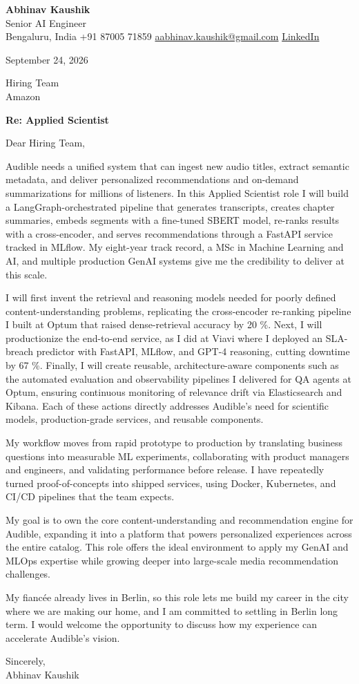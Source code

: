 \documentclass[11pt,a4paper]{article}
\begin{document}
{\Large\bfseries Abhinav Kaushik}\\
Senior AI Engineer\\
Bengaluru, India \textbar{} +91 87005 71859 \textbar{} \href{mailto:aabhinav.kaushik@gmail.com}{aabhinav.kaushik@gmail.com} \textbar{} \href{https://www.linkedin.com/in/abhinav-kaushik10/}{LinkedIn}  

September 24, 2026

Hiring Team\\
Amazon

\textbf{Re: Applied Scientist}

Dear Hiring Team,

Audible needs a unified system that can ingest new audio titles, extract semantic metadata, and deliver personalized recommendations and on-demand summarizations for millions of listeners. In this Applied Scientist role I will build a LangGraph-orchestrated pipeline that generates transcripts, creates chapter summaries, embeds segments with a fine-tuned SBERT model, re-ranks results with a cross-encoder, and serves recommendations through a FastAPI service tracked in MLflow. My eight-year track record, a MSc in Machine Learning and AI, and multiple production GenAI systems give me the credibility to deliver at this scale.

I will first invent the retrieval and reasoning models needed for poorly defined content-understanding problems, replicating the cross-encoder re-ranking pipeline I built at Optum that raised dense-retrieval accuracy by 20 \%. Next, I will productionize the end-to-end service, as I did at Viavi where I deployed an SLA-breach predictor with FastAPI, MLflow, and GPT-4 reasoning, cutting downtime by 67 \%. Finally, I will create reusable, architecture-aware components such as the automated evaluation and observability pipelines I delivered for QA agents at Optum, ensuring continuous monitoring of relevance drift via Elasticsearch and Kibana. Each of these actions directly addresses Audible's need for scientific models, production-grade services, and reusable components.

My workflow moves from rapid prototype to production by translating business questions into measurable ML experiments, collaborating with product managers and engineers, and validating performance before release. I have repeatedly turned proof-of-concepts into shipped services, using Docker, Kubernetes, and CI/CD pipelines that the team expects.

My goal is to own the core content-understanding and recommendation engine for Audible, expanding it into a platform that powers personalized experiences across the entire catalog. This role offers the ideal environment to apply my GenAI and MLOps expertise while growing deeper into large-scale media recommendation challenges.

My fiancée already lives in Berlin, so this role lets me build my career in the city where we are making our home, and I am committed to settling in Berlin long term. I would welcome the opportunity to discuss how my experience can accelerate Audible's vision.

Sincerely,\\[4pt]
Abhinav Kaushik
\end{document}
